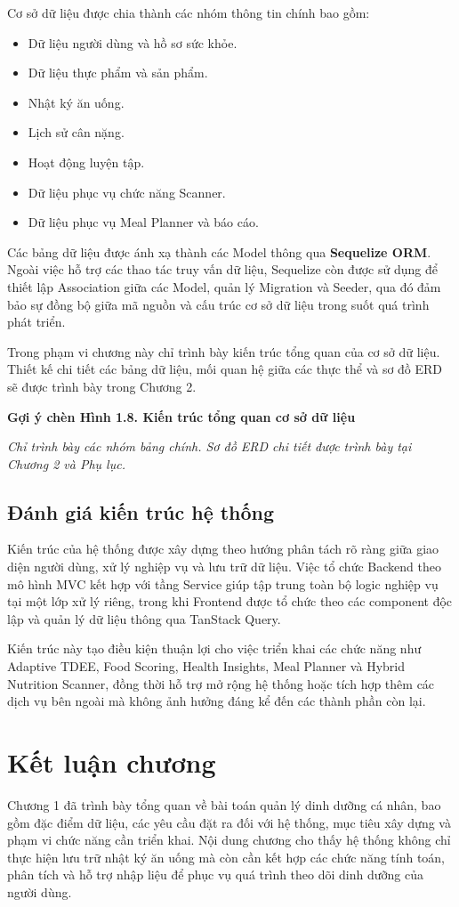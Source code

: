 \documentclass[12pt, a4paper]{report}
\begin{document}
Cơ sở dữ liệu được chia thành các nhóm thông tin chính bao gồm:

\begin{itemize}
\item Dữ liệu người dùng và hồ sơ sức khỏe.
\item Dữ liệu thực phẩm và sản phẩm.
\item Nhật ký ăn uống.
\item Lịch sử cân nặng.
\item Hoạt động luyện tập.
\item Dữ liệu phục vụ chức năng Scanner.
\item Dữ liệu phục vụ Meal Planner và báo cáo.
\end{itemize}
Các bảng dữ liệu được ánh xạ thành các Model thông qua \textbf{Sequelize ORM}. Ngoài việc hỗ trợ các thao tác truy vấn dữ liệu, Sequelize còn được sử dụng để thiết lập Association giữa các Model, quản lý Migration và Seeder, qua đó đảm bảo sự đồng bộ giữa mã nguồn và cấu trúc cơ sở dữ liệu trong suốt quá trình phát triển.

Trong phạm vi chương này chỉ trình bày kiến trúc tổng quan của cơ sở dữ liệu. Thiết kế chi tiết các bảng dữ liệu, mối quan hệ giữa các thực thể và sơ đồ ERD sẽ được trình bày trong Chương 2.

\textbf{Gợi ý chèn Hình 1.8. Kiến trúc tổng quan cơ sở dữ liệu}

\textit{Chỉ trình bày các nhóm bảng chính. Sơ đồ ERD chi tiết được trình bày tại Chương 2 và Phụ lục.}

\subsection{Đánh giá kiến trúc hệ thống}Kiến trúc của hệ thống được xây dựng theo hướng phân tách rõ ràng giữa giao diện người dùng, xử lý nghiệp vụ và lưu trữ dữ liệu. Việc tổ chức Backend theo mô hình MVC kết hợp với tầng Service giúp tập trung toàn bộ logic nghiệp vụ tại một lớp xử lý riêng, trong khi Frontend được tổ chức theo các component độc lập và quản lý dữ liệu thông qua TanStack Query.

Kiến trúc này tạo điều kiện thuận lợi cho việc triển khai các chức năng như Adaptive TDEE, Food Scoring, Health Insights, Meal Planner và Hybrid Nutrition Scanner, đồng thời hỗ trợ mở rộng hệ thống hoặc tích hợp thêm các dịch vụ bên ngoài mà không ảnh hưởng đáng kể đến các thành phần còn lại.

\section{Kết luận chương}Chương 1 đã trình bày tổng quan về bài toán quản lý dinh dưỡng cá nhân, bao gồm đặc điểm dữ liệu, các yêu cầu đặt ra đối với hệ thống, mục tiêu xây dựng và phạm vi chức năng cần triển khai. Nội dung chương cho thấy hệ thống không chỉ thực hiện lưu trữ nhật ký ăn uống mà còn cần kết hợp các chức năng tính toán, phân tích và hỗ trợ nhập liệu để phục vụ quá trình theo dõi dinh dưỡng của người dùng.
\end{document}
